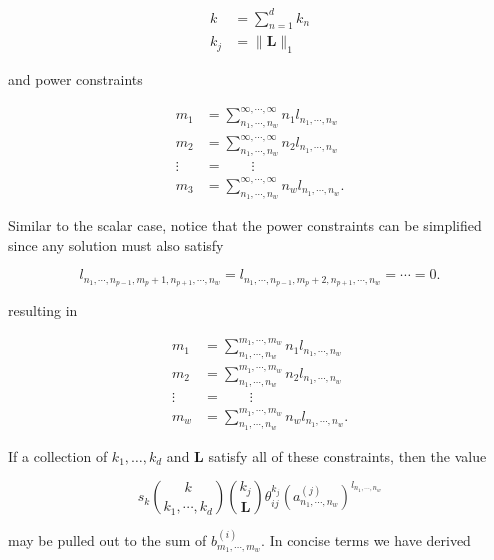 \begin{align}
    k &= \sum_{n=1}^{d} k_n \\
    k_j &= \lVert \mathbf{L} \rVert_1
\end{align}

and power constraints

\begin{align}
    m_1 &= \sum_{n_1, \cdots, n_w}^{\infty, \cdots, \infty} n_1 l_{n_1, \cdots, n_w} \nonumber \\
    m_2 &= \sum_{n_1, \cdots, n_w}^{\infty, \cdots, \infty} n_2 l_{n_1, \cdots, n_w} \nonumber \\
    \vdots \;\; &= \qquad \vdots \nonumber \\
    m_3 &= \sum_{n_1, \cdots, n_w}^{\infty, \cdots, \infty} n_w l_{n_1, \cdots, n_w}.
\end{align}

Similar to the scalar case, notice that the power constraints can be simplified since any solution must also satisfy

\begin{equation}
    l_{n_1, \cdots, n_{p-1}, m_p + 1, n_{p+1}, \cdots, n_w} = l_{n_1, \cdots, n_{p-1}, m_p + 2, n_{p+1}, \cdots, n_w} = \cdots = 0.
\end{equation}

resulting in

\begin{align}
    m_1 &= \sum_{n_1, \cdots, n_w}^{m_1, \cdots, m_w} n_1 l_{n_1, \cdots, n_w} \nonumber \\
    m_2 &= \sum_{n_1, \cdots, n_w}^{m_1, \cdots, m_w} n_2 l_{n_1, \cdots, n_w} \nonumber \\
    \vdots \;\; &= \qquad \vdots \nonumber \\
    m_w &= \sum_{n_1, \cdots, n_w}^{m_1, \cdots, m_w} n_w l_{n_1, \cdots, n_w}.
\end{align}

If a collection of $k_1, \ldots, k_d$ and $\mathbf{L}$ satisfy all of these constraints, then the value

\begin{equation*}
    s_k \binom{k}{k_1, \cdots, k_d} \binom{k_j}{\mathbf{L}} \theta_{ij}^{k_j} (a^{(j)}_{n_1, \cdots, n_w})^{l_{n_1, \cdots, n_w}}
\end{equation*}

may be pulled out to the sum of $b^{(i)}_{m_1, \cdots, m_w}$. In concise terms we have derived

